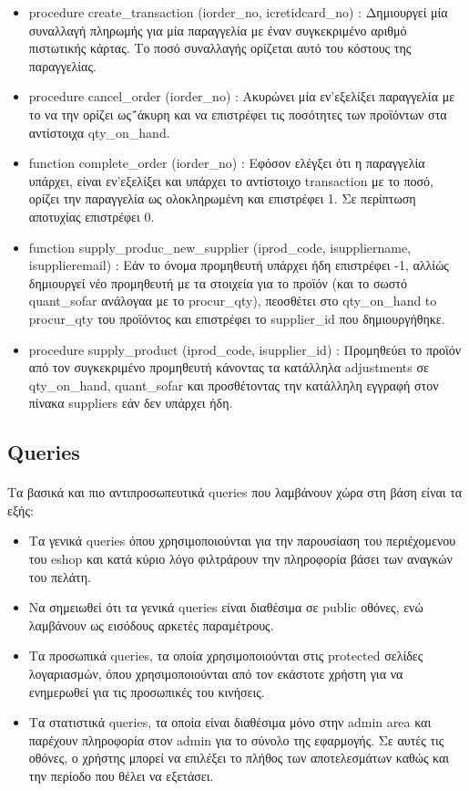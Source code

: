 \documentclass[12pt]{article}
\begin{document}
\begin{itemize}
  	  		\item procedure create\_transaction (iorder\_no, icretidcard\_no) : Δημιουργεί μία συναλλαγή πληρωμής για μία παραγγελία με έναν συγκεκριμένο αριθμό πιστωτικής κάρτας. Το ποσό συναλλαγής ορίζεται αυτό του κόστους της παραγγελίας.
  	  		\item procedure cancel\_order (iorder\_no) : Ακυρώνει μία εν'εξελίξει παραγγελία με το να την ορίζει ως΅άκυρη και να επιστρέφει τις ποσότητες των προϊόντων στα αντίστοιχα qty\_on\_hand.
  	  		\item function complete\_order (iorder\_no) : Εφόσον ελέγξει ότι η παραγγελία υπάρχει, είναι εν'εξελίξει και υπάρχει το αντίστοιχο transaction με το ποσό, ορίζει την παραγγελία ως ολοκληρωμένη και επιστρέφει 1. Σε περίπτωση αποτυχίας επιστρέφει 0.
  	  		\item function supply\_produc\_new\_supplier (iprod\_code, isuppliername, isupplieremail) : Εάν το όνομα προμηθευτή υπάρχει ήδη επιστρέφει -1, αλλίώς δημιουργεί νέο προμηθευτή με τα στοιχεία για το προϊόν (και το σωστό quant\_sofar ανάλογαα με το procur\_qty), πεοσθέτει στο qty\_on\_hand to procur\_qty του προϊόντος και επιστρέφει το supplier\_id που δημιουργήθηκε.
  	  		\item procedure supply\_product (iprod\_code, isupplier\_id) : Προμηθεύει το προϊόν από τον συγκεκριμένο προμηθευτή κάνοντας τα κατάλληλα adjustments σε qty\_on\_hand, quant\_sofar και προσθέτοντας την κατάλληλη εγγραφή στον πίνακα suppliers εάν δεν υπάρχει ήδη.
  	  	\end{itemize}
  	\subsection{Queries}
  	  \paragraph{}
  	  	 Τα βασικά και πιο αντιπροσωπευτικά queries που λαμβάνουν χώρα στη βάση είναι τα εξής:
  	  	 \begin{itemize}
  	  	 \item Τα γενικά queries όπου χρησιμοποιούνται για την παρουσίαση του περιέχομενου του eshop και κατά κύριο λόγο φιλτράρουν την πληροφορία βάσει των αναγκών του πελάτη.
  	  	 \item Να σημειωθεί ότι τα γενικά queries είναι διαθέσιμα σε public οθόνες, ενώ λαμβάνουν ως εισόδους αρκετές παραμέτρους.
  	  	 \item Τα προσωπικά queries, τα οποία χρησιμοποιούνται στις protected σελίδες λογαριασμών, όπου χρησιμοποιούνται από τον εκάστοτε χρήστη για να ενημερωθεί για τις προσωπικές του κινήσεις.
  	  	 \item Τα στατιστικά queries, τα οποία είναι διαθέσιμα μόνο στην admin area και παρέχουν πληροφορία στον admin για το σύνολο της εφαρμογής.
  	  	 Σε αυτές τις οθόνες, ο χρήστης μπορεί να επιλέξει το πλήθος των αποτελεσμάτων καθώς και την περίοδο που θέλει να εξετάσει.
  	  	 \end{itemize}
  	  	 
\end{document}
